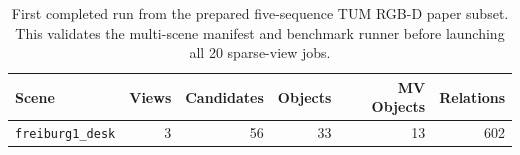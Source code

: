 \begin{table}[t]
\centering
\caption{First completed run from the prepared five-sequence TUM RGB-D paper subset. This validates the multi-scene manifest and benchmark runner before launching all 20 sparse-view jobs.}
\label{tab:tum_rgbd_paper_subset_smoke}
\begin{tabular}{l r r r r r}
\hline
Scene & Views & Candidates & Objects & MV Objects & Relations \\
\hline
\texttt{freiburg1\_desk} & 3 & 56 & 33 & 13 & 602 \\
\hline
\end{tabular}
\end{table}
